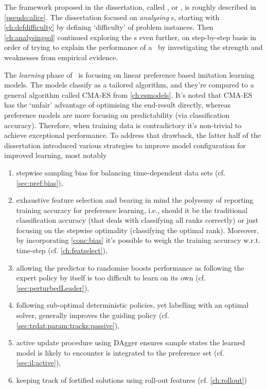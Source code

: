 

The framework proposed in the dissertation, called \fullnameAlice, or \Alice, 
is roughly described in \cref{pseudo:alice}. 
The dissertation focused on \emph{analysing} \sdr s, starting with 
\cref{ch:defdifficulty} by defining `difficulty' of problem instances. Then 
\cref{ch:analysingsol} continued exploring the \dr s even further, on  
step-by-step basis in order of trying to explain the performance 
of a \dr\ by investigating the strength and weaknesses from empirical evidence. 

The \emph{learning} phase of \Alice\ is focusing on linear preference based 
imitation learning models. The models classify as a tailored algorithm, and 
they're compared to a general algorithm called CMA-ES from \cref{ch:esmodels}. 
It's noted that CMA-ES has the `unfair' advantage of optimising the end-result 
directly, whereas preference models are more focusing on predictability (via 
classification accuracy). Therefore, when training data is contradictory it's 
non-trivial to achieve exceptional performance. 
To address that drawback, the latter half of the dissertation introduced 
various strategies to improve model configuration for improved learning, most 
notably 
\begin{enumerate}
    \item \label{conc:bias} stepwise sampling bias for balancing time-dependent 
    data sets (cf. \cref{sec:pref:bias}),
    \item exhaustive feature selection and bearing in mind the polysemy of 
    reporting training accuracy for preference learning, i.e., should it be the 
    traditional classification accuracy (that deals with classifying all ranks 
    correctly) or just focusing on the stepwise optimality (classifying the 
    optimal rank). Moreover, by incorporating \ref{conc:bias} it's possible to 
    weigh the training accuracy w.r.t. time-step 
    (cf. \cref{ch:featselect}),
    \item allowing the predictor to randomise boosts performance as following 
    the expert policy by itself is too difficult to learn on its own (cf. 
    \cref{sec:perturbedLeader}),
    \item following sub-optimal deterministic policies, yet labelling with an 
    optimal solver, generally improves the guiding policy (cf. 
    \cref{sec:trdat:param:tracks:passive}),
    \item active update procedure using DAgger ensures sample states the 
    learned model is likely to encounter is integrated to the preference set
    (cf. \cref{sec:il:active}),
    \item keeping track of fortified solutions using roll-out features (cf. 
    \cref{ch:rollout})
\end{enumerate}
